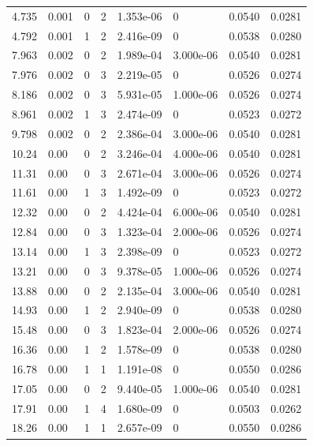 \documentclass[preview]{standalone}
\begin{document}
{{\begin{tabular}{L{1.2cm}C{1.2cm} C{0.3cm}C{0.5cm} C{1.4cm}C{1.4cm} C{1.4cm}C{1.4cm}}
  4.735  &  0.001  & 0     &  2 &  1.353e-06  & 0  & 0.0540 &  0.0281   \\ 
  4.792  &  0.001  & 1     &  2 &  2.416e-09  & 0  & 0.0538 &  0.0280   \\ 
  7.963  &  0.002  & 0     &  2 &  1.989e-04  & 3.000e-06  & 0.0540 &  0.0281   \\ 
  7.976  &  0.002  & 0     &  3 &  2.219e-05  & 0  & 0.0526 &  0.0274   \\ 
  8.186  &  0.002  & 0     &  3 &  5.931e-05  & 1.000e-06  & 0.0526 &  0.0274   \\ 
  8.961  &  0.002  & 1     &  3 &  2.474e-09  & 0  & 0.0523 &  0.0272   \\ 
  9.798  &  0.002  & 0     &  2 &  2.386e-04  & 3.000e-06  & 0.0540 &  0.0281   \\ 
  10.24  &  0.00  & 0     &  2 &  3.246e-04  & 4.000e-06  & 0.0540 &  0.0281   \\ 
  11.31  &  0.00  & 0     &  3 &  2.671e-04  & 3.000e-06  & 0.0526 &  0.0274   \\ 
  11.61  &  0.00  & 1     &  3 &  1.492e-09  & 0  & 0.0523 &  0.0272   \\ 
  12.32  &  0.00  & 0     &  2 &  4.424e-04  & 6.000e-06  & 0.0540 &  0.0281   \\ 
  12.84  &  0.00  & 0     &  3 &  1.323e-04  & 2.000e-06  & 0.0526 &  0.0274   \\ 
  13.14  &  0.00  & 1     &  3 &  2.398e-09  & 0  & 0.0523 &  0.0272   \\ 
  13.21  &  0.00  & 0     &  3 &  9.378e-05  & 1.000e-06  & 0.0526 &  0.0274   \\ 
  13.88  &  0.00  & 0     &  2 &  2.135e-04  & 3.000e-06  & 0.0540 &  0.0281   \\ 
  14.93  &  0.00  & 1     &  2 &  2.940e-09  & 0  & 0.0538 &  0.0280   \\ 
  15.48  &  0.00  & 0     &  3 &  1.823e-04  & 2.000e-06  & 0.0526 &  0.0274   \\ 
  16.36  &  0.00  & 1     &  2 &  1.578e-09  & 0  & 0.0538 &  0.0280   \\ 
  16.78  &  0.00  & 1     &  1 &  1.191e-08  & 0  & 0.0550 &  0.0286   \\ 
  17.05  &  0.00  & 0     &  2 &  9.440e-05  & 1.000e-06  & 0.0540 &  0.0281   \\ 
  17.91  &  0.00  & 1     &  4 &  1.680e-09  & 0  & 0.0503 &  0.0262   \\ 
  18.26  &  0.00  & 1     &  1 &  2.657e-09  & 0  & 0.0550 &  0.0286   \\ 

\end{tabular}}}
\end{document}
